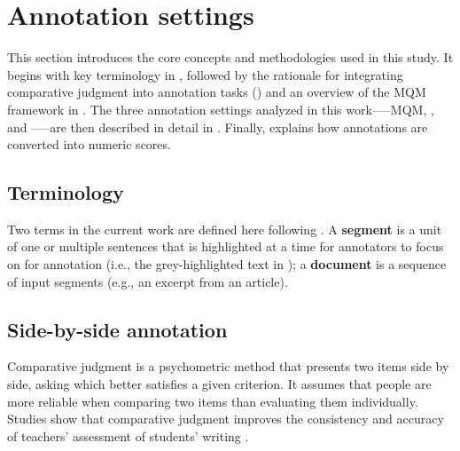 \section{Annotation settings}\label{sec:annotation_settings}

This section introduces the core concepts and methodologies used in this study. It begins with key terminology in , followed by the rationale for integrating comparative judgment into annotation tasks () and an overview of the MQM framework in . The three annotation settings analyzed in this work--—MQM, \sxsmqm, and \sxsqr—--are then described in detail in . Finally,  explains how annotations are converted into numeric scores.

\subsection{Terminology}\label{sec:term}

Two terms in the current work are defined here following \citet{riley-etal-2024-finding}.  A \textbf{segment} is a unit of one or multiple sentences that is highlighted at a time for annotators to focus on for annotation (i.e., the grey-highlighted text in ); a \textbf{document} is a sequence of input segments (e.g., an excerpt from an article).

    

\subsection{Side-by-side annotation}\label{sec:comparative_judgement}

Comparative judgment \citep{LCJ1927} is a psychometric method that presents two items side by side, asking which better satisfies a given criterion. It assumes that people are more reliable when comparing two items than evaluating them individually. Studies show that comparative judgment improves the consistency and accuracy of teachers' assessment of students' writing \citep{ACJ, de-Moira-2022, Jones-2024}. 

